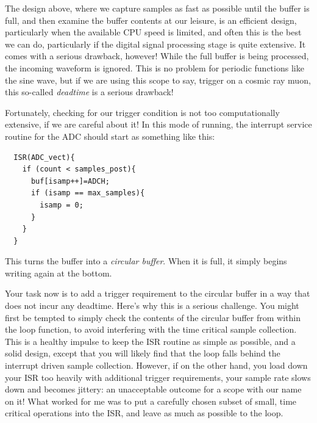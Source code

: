 \documentclass[12pt]{article}
\begin{document}
The design above, where we capture samples as fast as possible until the buffer is full, and then examine the buffer contents at our leisure, is an efficient design, particularly when the available CPU speed is limited, and often this is the best we can do, particularly if the digital signal processing stage is quite extensive.  It comes with a serious drawback, however!  While the full buffer is being processed, the incoming waveform is ignored.  This is no problem for periodic functions like the sine wave, but if we are using this scope to say, trigger on a cosmic ray muon, this so-called {\em deadtime} is a serious drawback!

Fortunately, checking for our trigger condition is not too computationally extensive, if we are careful about it!  In this mode of running, the interrupt service routine for the ADC should start as something like this:

\begin{verbatim}
  ISR(ADC_vect){
    if (count < samples_post){
      buf[isamp++]=ADCH;
      if (isamp == max_samples){
        isamp = 0;
      }  
    }
  }
\end{verbatim}

This turns the buffer into a {\em circular buffer}.  When it is full, it simply begins writing again at the bottom.

Your task now is to add a trigger requirement to the circular buffer in a way that does not incur any deadtime.  Here's why this is a serious challenge.  You might first be tempted to simply check the contents of the circular buffer from within the loop function, to avoid interfering with the time critical sample collection.  This is a healthy impulse to keep the ISR routine as simple as possible, and a solid design, except that you will likely find that the loop falls behind the interrupt driven sample collection.  However, if on the other hand, you load down your ISR too heavily with additional trigger requirements, your sample rate slows down and becomes jittery:  an unacceptable outcome for a scope with our name on it!  What worked for me was to put a carefully chosen subset of small, time critical operations into the ISR, and leave as much as possible to the loop.
\end{document}
